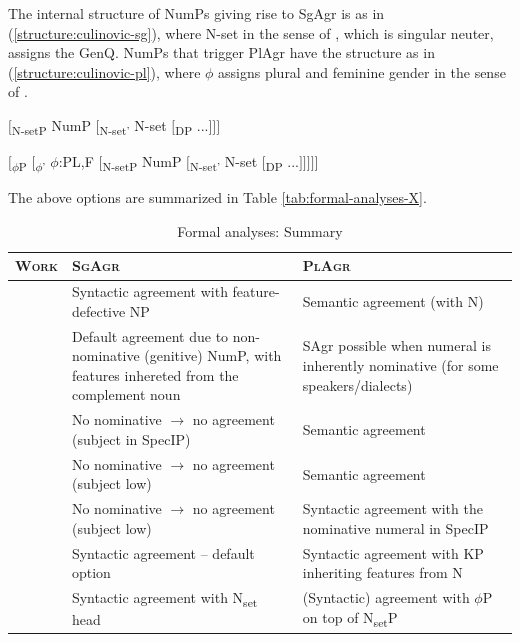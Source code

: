 \documentclass[output=paper,colorlinks,citecolor=brown
]{langscibook}
\begin{document}
\noindent The internal structure of NumPs giving rise to SgAgr is as in (\ref{structure:culinovic-sg}), where N-set in the sense of \citet{kayne2016some}, which is singular neuter, assigns the GenQ. NumPs that trigger PlAgr have the structure as in (\ref{structure:culinovic-pl}), where $\phi$ assigns plural and feminine gender in the sense of \citet{sauerland2004}.


\ea $[$\textsubscript{N-setP} NumP $[$\textsubscript{N-set'} N-set $[$\textsubscript{DP} ...$]$$]$$]$ \label{structure:culinovic-sg}
\z



\ea $[$\textsubscript{$\phi$P} $[$\textsubscript{$\phi$'} $\phi$:PL,F $[$\textsubscript{N-setP} NumP $[$\textsubscript{N-set'} N-set $[$\textsubscript{DP} ...$]$$]$$]$$]$$]$ \label{structure:culinovic-pl}
\z

\noindent The above options are summarized in Table \ref{tab:formal-analyses-X}.

\begin{table}[hbt!] 
    \centering
    \footnotesize %
    \renewcommand{\arraystretch}{1.2} %
    \caption{Formal analyses: Summary}
    \begin{tabular}{|l|p{4cm}|p{4cm}|} %
        \hline
        \textsc{Work} & \textsc{SgAgr} & \textsc{PlAgr} \\ [0.5ex]
        \hline\hline
        \citet{Franks1995} & Syntactic agreement with feature-defective NP & Semantic agreement (with N) \\ 
        \hline
        \citet{Zlatic1997} & Default agreement due to non-nominative (genitive) NumP, with features inhereted from the complement noun & SAgr possible when numeral is inherently nominative (for some speakers/dialects) \\ 
        \hline
        \citet{Boskovic2008} & No nominative $\rightarrow$ no agreement (subject in SpecIP) & Semantic agreement \\ 
        \hline
        \citet{Boskovic2008} & No nominative $\rightarrow$ no agreement (subject low) & Semantic agreement \\ 
        \hline
        \citet{Boskovic2008} & No nominative $\rightarrow$ no agreement (subject low) & Syntactic agreement with the nominative numeral in SpecIP \\ 
        \hline
        \citet{Driemel2019} & Syntactic agreement – default option & Syntactic agreement with KP inheriting features from N \\ 
        \hline
        \citet{Culinovic2017} & Syntactic agreement with N\textsubscript{set} head & (Syntactic) agreement with $\phi$P on top of N\textsubscript{set}P \\ 
        \hline
    \end{tabular}
\end{table} \label{tab:formal-analyses-X}
\end{document}

